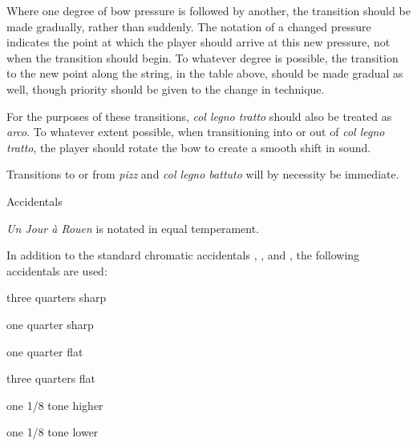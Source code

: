 \documentclass{article}
\begin{document}
Where one degree of bow pressure is followed by another, the transition
should be made gradually, rather than suddenly. The notation of a changed
pressure indicates the point at which the player should arrive at this new
pressure, not when the transition should begin. To whatever degree is possible,
the transition to the new point along the string, in the table above, should be
made gradual as well, though priority should be given to the change in technique.

For the purposes of these transitions, \textit{col legno tratto} should also
be treated as \textit{arco}. To whatever extent possible, when transitioning
into or out of \textit{col legno tratto}, the player should rotate the
bow to create a smooth shift in sound.

Transitions to or from \textit{pizz} and \textit{col legno battuto}
will by necessity be immediate.



% 
\break
{\large Accidentals}

\textit{Un Jour à Rouen} is notated in equal temperament.

In addition to the standard chromatic accidentals \hspace{.2em} \flat, \sharp, and \natural, the following accidentals are used:

 \hspace{.2em} three quarters sharp

 \hspace{.2em} one quarter sharp

 \hspace{.5em} one quarter flat

 \hspace{.5em} three quarters flat

 \hspace{.5em}
 \hspace{.5em}
 \hspace{.5em} one 1/8 tone higher

 \hspace{.5em}
 \hspace{.5em}
 \hspace{.5em} one 1/8 tone lower
\end{document}
